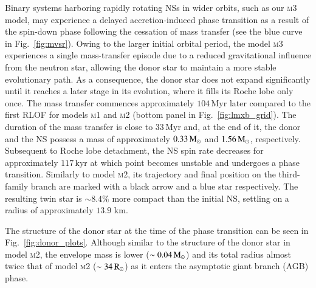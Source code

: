 \documentclass[main.tex]{subfiles}
\begin{document}
    Binary systems harboring rapidly rotating NSs in wider orbits, such as our \textsc{m3} model, 
    may experience a delayed accretion-induced phase transition as a result of the spin-down phase
    following the cessation of mass transfer (see the blue curve in Fig.~\ref{fig:mvsr}). Owing to the 
    larger initial orbital period, the model \textsc{m3} experiences a single mass-transfer episode 
    due to a reduced gravitational influence from the neutron star, allowing the donor star to maintain a more stable evolutionary path. As a consequence, the donor star does not expand significantly until it reaches a later stage in its evolution, where it fills its Roche lobe only once.
    The mass transfer commences approximately $104\,\mathrm{Myr}$ later compared to the first RLOF for models \textsc{m1} and \textsc{m2} (bottom panel in Fig.~\ref{fig:lmxb_grid}). The duration of the
    mass transfer is close to $33\,\mathrm{Myr}$ and, at the end of it, the donor and the NS possess a mass of approximately $0.33\mathrm{\,M_\odot}$ and $1.56\mathrm{\,M_\odot}$, respectively. Subsequent to Roche lobe detachment, the NS spin rate decreases for approximately $117\,\mathrm{kyr}$ at which point becomes unstable and undergoes a phase transition. Similarly to model \textsc{m2}, its trajectory and final position on the third-family branch are marked with a black arrow and a blue star respectively. The resulting twin star is $\sim 8.4\%$ more compact than the initial NS, settling on a radius of approximately $13.9$ km. 
    
    The structure of the donor star at the time of the phase transition can be seen in Fig.~\ref{fig:donor_plots}. Although similar to the structure of the donor star in model \textsc{m2}, the envelope mass is lower ($\sim 0.04\mathrm{\,M_\odot}$) and its total radius almost twice that of model \textsc{m2} ($\sim 34\mathrm{\,R_\odot}$) as it enters the asymptotic giant branch (AGB) phase.
    
\end{document}
